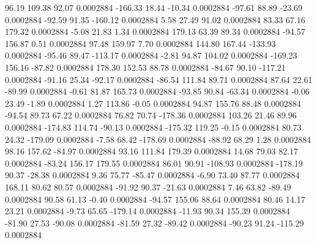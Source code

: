        96.19      109.38       92.07     0.0002884
     -166.33       18.44      -10.34     0.0002884
      -97.61       88.89      -23.69     0.0002884
      -92.59       91.35     -160.12     0.0002884
        5.58       27.49       91.02     0.0002884
       83.33       67.16      179.32     0.0002884
       -5.08       21.83        1.34     0.0002884
      179.13       63.39       89.34     0.0002884
      -94.57      156.87        0.51     0.0002884
       97.48      159.97        7.70     0.0002884
      144.80      167.44     -133.93     0.0002884
      -95.46       89.47     -113.17     0.0002884
       -2.81       94.87      104.02     0.0002884
     -169.23      156.16      -87.82     0.0002884
      178.30      152.53       88.78     0.0002884
      -84.67       90.10     -117.21     0.0002884
      -91.16       25.34      -92.17     0.0002884
      -86.54      111.84       89.71     0.0002884
       87.64       22.61      -89.99     0.0002884
       -0.61       81.87      165.73     0.0002884
      -93.85       90.84      -63.34     0.0002884
       -0.06       23.49       -1.89     0.0002884
        1.27      113.86       -0.05     0.0002884
       94.87      155.76       88.48     0.0002884
      -94.54       89.73       67.22     0.0002884
       76.82       70.74     -178.36     0.0002884
      103.26       21.46       89.96     0.0002884
     -174.83      114.74      -90.13     0.0002884
     -175.32      119.25       -0.15     0.0002884
       80.73       24.32     -179.09     0.0002884
       -7.58       68.42     -178.69     0.0002884
      -88.92       68.29        1.28     0.0002884
       98.16      157.62      -84.97     0.0002884
       93.16      111.84      179.39     0.0002884
       14.68       79.03       82.17     0.0002884
      -83.24      156.17      179.55     0.0002884
       86.01       90.91     -108.93     0.0002884
     -178.19       90.37      -28.38     0.0002884
        9.36       75.77      -85.47     0.0002884
       -6.90       73.40       87.77     0.0002884
      168.11       80.62       80.57     0.0002884
      -91.92       90.37      -21.63     0.0002884
        7.46       63.82      -89.49     0.0002884
       90.58       61.13       -0.40     0.0002884
      -94.57      155.06       88.64     0.0002884
       80.46       14.17       23.21     0.0002884
       -9.73       65.65     -179.14     0.0002884
      -11.93       90.34      155.39     0.0002884
      -81.90       27.53      -90.08     0.0002884
      -81.59       27.32      -89.42     0.0002884
      -90.23       91.24     -115.29     0.0002884
